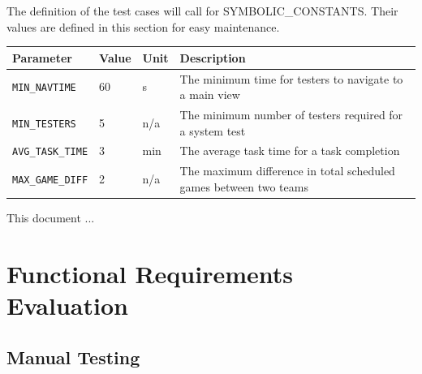 \documentclass[12pt, titlepage]{article}
\begin{document}
The definition of the test cases will call for SYMBOLIC\_CONSTANTS.
Their values are defined in this section for easy maintenance.
\begin{longtable}{|l|l|l|p{5cm}|}
    \hline
    Parameter & Value & Unit & Description \\
    \hline
    \label{MIN_NAVTIME} \texttt{MIN\_NAVTIME} & 60 & s & The minimum time for testers to navigate to a main view \\
    \hline
    \label{MIN_TESTERS} \texttt{MIN\_TESTERS} & 5 & n/a & The minimum number of testers required for a system test \\
    \hline
    \label{AVG_TASK_TIME} \texttt{AVG\_TASK\_TIME} & 3 & min & The average task time for a task completion \\
    \hline
    \label{MAX_GAME_DIFF} \texttt{MAX\_GAME\_DIFF} & 2 & n/a & The maximum difference in total scheduled games between two teams \\
    \hline
\end{longtable}


\newpage

\tableofcontents

\listoftables %

\listoffigures %

\newpage


This document ...

\section{Functional Requirements Evaluation}

\subsection{Manual Testing}
\end{document}
